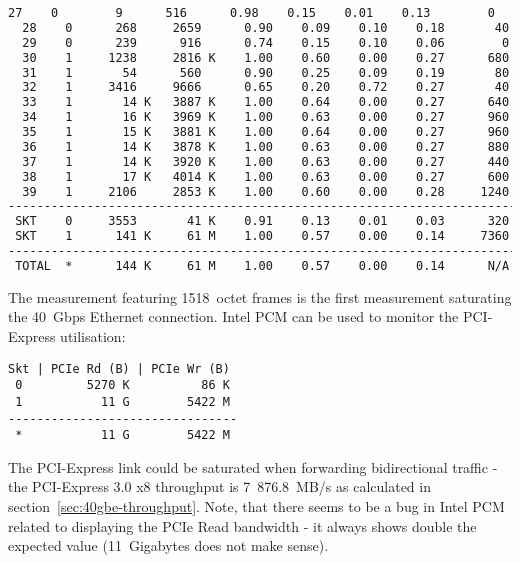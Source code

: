 \begin{lstlisting}[language=TeX]
  27    0        9      516      0.98    0.15    0.01    0.13        0
  28    0      268     2659      0.90    0.09    0.10    0.18       40
  29    0      239      916      0.74    0.15    0.10    0.06        0
  30    1     1238     2816 K    1.00    0.60    0.00    0.27      680
  31    1       54      560      0.90    0.25    0.09    0.19       80
  32    1     3416     9666      0.65    0.20    0.72    0.27       40
  33    1       14 K   3887 K    1.00    0.64    0.00    0.27      640
  34    1       16 K   3969 K    1.00    0.63    0.00    0.27      960
  35    1       15 K   3881 K    1.00    0.64    0.00    0.27      960
  36    1       14 K   3878 K    1.00    0.63    0.00    0.27      880
  37    1       14 K   3920 K    1.00    0.63    0.00    0.27      440
  38    1       17 K   4014 K    1.00    0.63    0.00    0.27      600
  39    1     2106     2853 K    1.00    0.60    0.00    0.28     1240
------------------------------------------------------------------------
 SKT    0     3553       41 K    0.91    0.13    0.01    0.03      320
 SKT    1      141 K     61 M    1.00    0.57    0.00    0.14     7360
------------------------------------------------------------------------
 TOTAL  *      144 K     61 M    1.00    0.57    0.00    0.14      N/A 
\end{lstlisting}
The measurement featuring 1518~octet frames is the first measurement saturating the 40~Gbps Ethernet connection.
Intel PCM can be used to monitor the PCI-Express utilisation:
\begin{lstlisting}
Skt | PCIe Rd (B) | PCIe Wr (B)
 0         5270 K          86 K
 1           11 G        5422 M
--------------------------------
 *           11 G        5422 M
\end{lstlisting}
The PCI-Express link could be saturated when forwarding bidirectional traffic
- the PCI-Express 3.0 x8 throughput is 7~876.8~MB/s as calculated in section~\ref{sec:40gbe-throughput}.
Note, that there seems to be a bug in Intel PCM related to displaying
the PCIe Read bandwidth - it always shows double the expected value (11~Gigabytes does not make sense).
